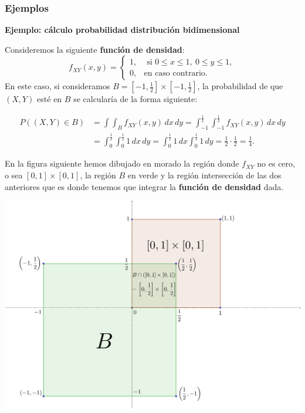 \documentclass[]{book}
\begin{document}
\hypertarget{ejemplos}{%
\subsubsection{Ejemplos}\label{ejemplos}}

\textbf{Ejemplo: cálculo probabilidad distribución bidimensional}

Consideremos la siguiente \textbf{función de densidad}:
\[
f_{XY}(x,y)=\begin{cases}
1, & \mbox{ si }0\leq x\leq 1,\ 0\leq y\leq 1, \\
0, & \mbox{en caso contrario.}
\end{cases}
\]
En este caso, si consideramos \(B=\left[-1,\frac{1}{2}\right]\times \left[-1,\frac{1}{2}\right]\), la probabilidad de que \((X,Y)\) esté en \(B\) se calcularía de la forma siguiente:

\[
\begin{array}{rl}
P((X,Y)\in B)&=\int\int_{B} f_{XY}(x,y)\, dx\, dy=\int_{-1}^{\frac{1}{2}}\int_{-1}^{\frac{1}{2}} f_{XY}(x,y)\, dx\, dy \\
&=\int_0^{\frac{1}{2}}\int_0^{\frac{1}{2}} 1\, dx\,dy=\int_0^{\frac{1}{2}} 1\, dx\int_0^{\frac{1}{2}} 1\, dy=\frac{1}{2}\cdot\frac{1}{2}=\frac{1}{4}.
\end{array}
\]

En la figura siguiente hemos dibujado en morado la región donde \(f_{XY}\) no es cero, o sea \([0,1]\times [0,1]\), la región \(B\) en verde y la región intersección de las dos anteriores que es donde tenemos que integrar la \textbf{función de densidad} dada.

\includegraphics{Images/VaUniformeBidi.png}
\end{document}

